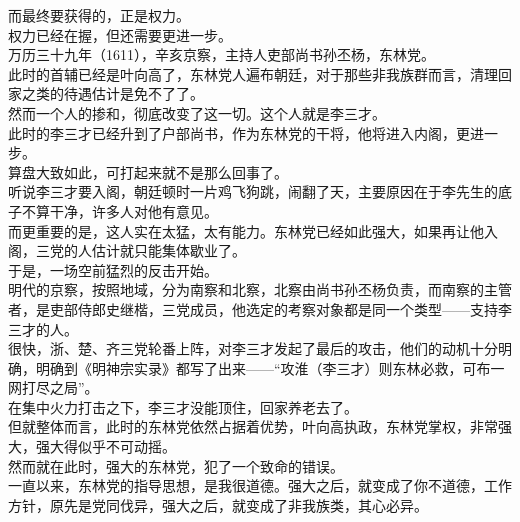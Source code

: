 \begin{multicols}{\theparacolNo}
而最终要获得的，正是权力。\\

权力已经在握，但还需要更进一步。\\

万历三十九年（1611），辛亥京察，主持人吏部尚书孙丕杨，东林党。\\

此时的首辅已经是叶向高了，东林党人遍布朝廷，对于那些非我族群而言，清理回家之类的待遇估计是免不了了。\\

然而一个人的掺和，彻底改变了这一切。这个人就是李三才。\\

此时的李三才已经升到了户部尚书，作为东林党的干将，他将进入内阁，更进一步。\\

算盘大致如此，可打起来就不是那么回事了。\\

听说李三才要入阁，朝廷顿时一片鸡飞狗跳，闹翻了天，主要原因在于李先生的底子不算干净，许多人对他有意见。\\

而更重要的是，这人实在太猛，太有能力。东林党已经如此强大，如果再让他入阁，三党的人估计就只能集体歇业了。\\

于是，一场空前猛烈的反击开始。\\

明代的京察，按照地域，分为南察和北察，北察由尚书孙丕杨负责，而南察的主管者，是吏部侍郎史继楷，三党成员，他选定的考察对象都是同一个类型——支持李三才的人。\\

很快，浙、楚、齐三党轮番上阵，对李三才发起了最后的攻击，他们的动机十分明确，明确到《明神宗实录》都写了出来——“攻淮（李三才）则东林必救，可布一网打尽之局”。\\

在集中火力打击之下，李三才没能顶住，回家养老去了。\\

但就整体而言，此时的东林党依然占据着优势，叶向高执政，东林党掌权，非常强大，强大得似乎不可动摇。\\

然而就在此时，强大的东林党，犯了一个致命的错误。\\

一直以来，东林党的指导思想，是我很道德。强大之后，就变成了你不道德，工作方针，原先是党同伐异，强大之后，就变成了非我族类，其心必异。\\


\end{multicols}
